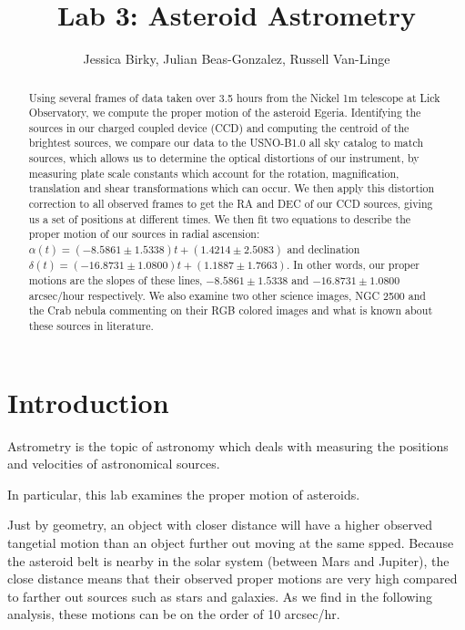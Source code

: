 \documentclass[preprint]{aastex62}
\begin{document}
\title{\sc Lab 3: Asteroid Astrometry}
\author{Jessica Birky, Julian Beas-Gonzalez, Russell Van-Linge}


\begin{abstract}
Using several frames of data taken over 3.5 hours from the Nickel 1m telescope at Lick Observatory, we compute the proper motion of the asteroid Egeria. Identifying the sources in our charged coupled device (CCD) and computing the centroid of the brightest sources, we compare our data to the USNO-B1.0 all sky catalog to match sources, which allows us to determine the optical distortions of our instrument, by measuring plate scale constants which account for the rotation, magnification, translation and shear transformations which can occur. We then apply this distortion correction to all observed frames to get the RA and DEC of our CCD sources, giving us a set of positions at different times.
We then fit two equations to describe the proper motion of our sources in radial ascension:
$\alpha(t)=(-8.5861\pm1.5338)t + (1.4214\pm2.5083)$
and declination
$\delta(t)=(-16.8731\pm1.0800)t + (1.1887\pm1.7663)$.
In other words, our proper motions are the slopes of these lines, $-8.5861\pm1.5338$ and $-16.8731\pm1.0800$ arcsec/hour respectively. We also examine two other science images, NGC 2500 and the Crab nebula commenting on their RGB colored images and what is known about these sources in literature.

\end{abstract}
\bigskip

\section{Introduction} 
Astrometry is the topic of astronomy which deals with measuring the positions and velocities of astronomical sources.

In particular, this lab examines the proper motion of asteroids. 

Just by geometry, an object with closer distance will have a higher observed tangetial motion than an object further out moving at the same spped. Because the asteroid belt is nearby in the solar system (between Mars and Jupiter), the close distance means that their observed proper motions are very high compared to farther out sources such as stars and galaxies. As we find in the following analysis, these motions can be on the order of 10 arcsec/hr.
\end{document}
